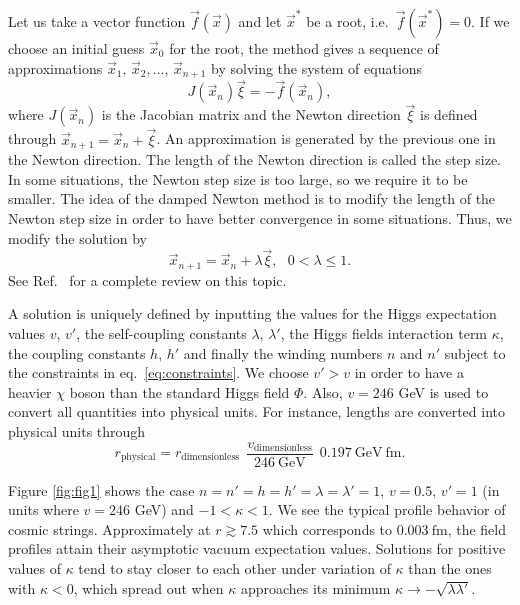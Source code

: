 Let us take a vector function $\vec{f}(\vec{x})$ and let $\vec{x}^*$ be a root, i.e.\ $\vec{f}(\vec{x}^*)=0$. If we choose an initial guess $\vec{x}_0$ for the root, the method gives a sequence of approximations $\vec{x}_{1},\, \vec{x}_{2},\dots,\, \vec{x}_{n+1}$ by solving the system of equations
\begin{equation}
	J(\vec{x}_n)\vec{\xi} = - \vec{f}(\vec{x}_n), 
\end{equation}
where $J(\vec{x}_n)$ is the Jacobian matrix and the Newton direction $\vec{\xi}$ is defined through $\vec{x}_{n+1} = \vec{x}_{n}+\vec{\xi}$.
An ap\-prox\-i\-ma\-tion is generated by the previous one in the Newton direction. The length of the Newton direction is called the step size. In some situations, the Newton step size is too large, so we require it to be smaller. The idea of the damped Newton method is to modify the length of the Newton step size in order to have better convergence in some situations. Thus, we modify the solution by
\begin{equation}
	\vec{x}_{n+1} = \vec{x}_{n} + \lambda\vec{\xi}, \ \ \ 0<\lambda\leq 1.
\end{equation} 
See Ref.\ \cite{Ascher} for a complete review on this topic.

 A solution is uniquely defined by inputting the values for the Higgs expectation values $v$, $v'$, the self-coupling constants $\lambda$, $\lambda'$, the Higgs fields interaction term $\kappa$, the coupling constants $h$, $h'$ and finally the winding numbers $n$ and $n'$ subject to the constraints in eq.\ \eqref{eq:constraints}. We choose $v'>v$ in order to have a heavier $\chi$ boson than the standard Higgs field $\Phi$. Also, $v=246$ GeV is used to convert all quantities into physical units.  For instance, lengths are converted into physical units through
\begin{equation}
	r_{\text{physical}} = r_{\text{dimensionless}} \ \ \frac{v_{\text{dimensionless}}}{246 \ \text{GeV}} \ \ 0.197 \ \text{GeV} \ \text{fm}.
\end{equation}

Figure \ref{fig:fig1} shows the case $n=n'=h=h'=\lambda=\lambda'=1$, $v = 0.5$, $v'=1$ (in units where $v=246$ GeV) and $-1<\kappa<1$. We see the typical profile behavior of cosmic strings. Approximately at $r \gtrsim 7.5$ which corresponds to  $0.003\ \text{fm}$, the field profiles attain their asymptotic vacuum expectation values. Solutions for positive values of $\kappa$ tend to stay closer to each other under variation  of $\kappa$ than the ones with $\kappa<0$, which spread out when $\kappa$ approaches its minimum $\kappa\to-\sqrt{\lambda\lambda'}$.

